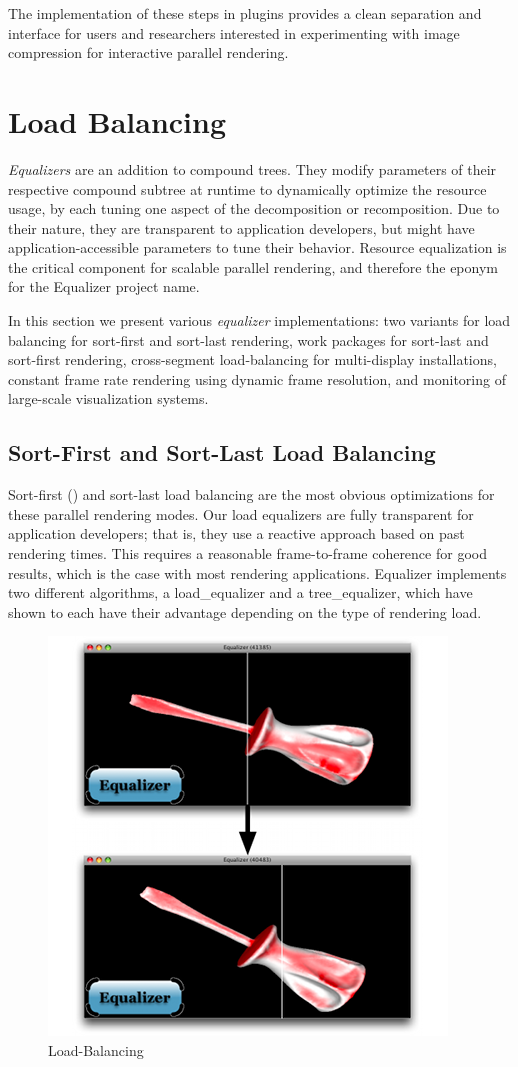The implementation of these steps in plugins provides a clean separation and
interface for users and researchers interested in experimenting with image
compression for interactive parallel rendering.


\chapter{Load Balancing}\label{sLoadBalancing}

{\em Equalizers} are an addition to compound trees. They modify parameters of
their respective compound subtree at runtime to dynamically optimize the
resource usage, by each tuning one aspect of the decomposition or recomposition.
Due to their nature, they are transparent to application developers, but might
have application-accessible parameters to tune their behavior. Resource
equalization is the critical component for scalable parallel rendering, and
therefore the eponym for the \textsf{Equalizer} project name.

In this section we present various {\em equalizer} implementations: two
variants for load balancing for sort-first and sort-last rendering, work
packages for sort-last and sort-first rendering, cross-segment load-balancing
for multi-display installations, constant frame rate rendering using dynamic
frame resolution, and monitoring of large-scale visualization systems.

\section{Sort-First and Sort-Last Load Balancing}

Sort-first () and sort-last load balancing are the most obvious
optimizations for these parallel rendering modes. Our load equalizers are fully
transparent for application developers; that is, they use a reactive approach
based on past rendering times. This requires a reasonable frame-to-frame
coherence for good results, which is the case with most rendering applications.
Equalizer implements two different algorithms, a \textsf{load\_equalizer} and a
\textsf{tree\_equalizer}, which have shown to each have their advantage
depending on the type of rendering load.

\begin{figure}
  \includegraphics[width=.382\textwidth]{images/loadeq}
  \caption{\label{floadeq}Load-Balancing}
\end{figure}

